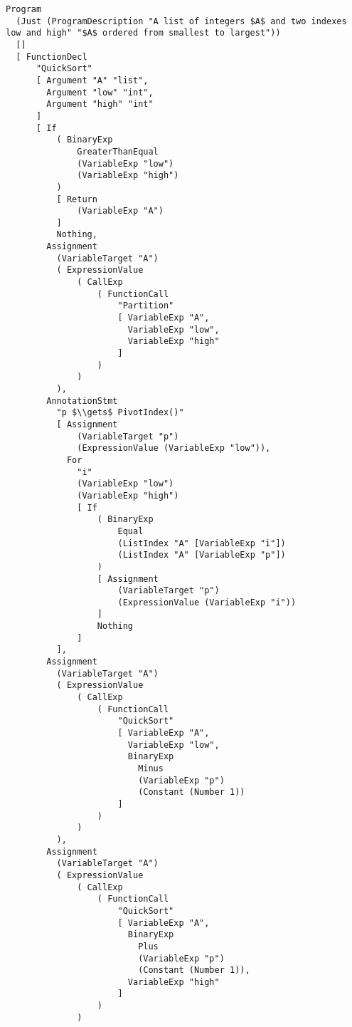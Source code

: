 \begin{lstlisting}
Program
  (Just (ProgramDescription "A list of integers $A$ and two indexes low and high" "$A$ ordered from smallest to largest"))
  []
  [ FunctionDecl
      "QuickSort"
      [ Argument "A" "list",
        Argument "low" "int",
        Argument "high" "int"
      ]
      [ If
          ( BinaryExp
              GreaterThanEqual
              (VariableExp "low")
              (VariableExp "high")
          )
          [ Return
              (VariableExp "A")
          ]
          Nothing,
        Assignment
          (VariableTarget "A")
          ( ExpressionValue
              ( CallExp
                  ( FunctionCall
                      "Partition"
                      [ VariableExp "A",
                        VariableExp "low",
                        VariableExp "high"
                      ]
                  )
              )
          ),
        AnnotationStmt
          "p $\\gets$ PivotIndex()"
          [ Assignment
              (VariableTarget "p")
              (ExpressionValue (VariableExp "low")),
            For
              "i"
              (VariableExp "low")
              (VariableExp "high")
              [ If
                  ( BinaryExp
                      Equal
                      (ListIndex "A" [VariableExp "i"])
                      (ListIndex "A" [VariableExp "p"])
                  )
                  [ Assignment
                      (VariableTarget "p")
                      (ExpressionValue (VariableExp "i"))
                  ]
                  Nothing
              ]
          ],
        Assignment
          (VariableTarget "A")
          ( ExpressionValue
              ( CallExp
                  ( FunctionCall
                      "QuickSort"
                      [ VariableExp "A",
                        VariableExp "low",
                        BinaryExp
                          Minus
                          (VariableExp "p")
                          (Constant (Number 1))
                      ]
                  )
              )
          ),
        Assignment
          (VariableTarget "A")
          ( ExpressionValue
              ( CallExp
                  ( FunctionCall
                      "QuickSort"
                      [ VariableExp "A",
                        BinaryExp
                          Plus
                          (VariableExp "p")
                          (Constant (Number 1)),
                        VariableExp "high"
                      ]
                  )
              )

\end{lstlisting}
